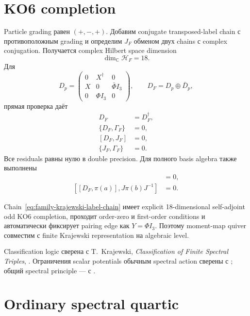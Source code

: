 \section{KO6 completion}

Particle grading равен \((+,-,+)\). Добавим conjugate transposed-label
chain с противоположным grading и определим \(J_F\) обменом двух chains с
complex conjugation. Получается complex Hilbert space dimension
\begin{equation}
 \dim_{\mathbb C}\mathcal H_F=18.
\end{equation}
Для
\begin{equation}
 D_p=
 \begin{pmatrix}
 0&X^\dagger&0\\
 X&0&\bar\Phi I_3\\
 0&\Phi I_3&0
 \end{pmatrix},
 \qquad
 D_F=D_p\oplus\bar D_p,
 \label{eq:family-quiver-ko6-dirac}
\end{equation}
прямая проверка даёт
\begin{align}
 D_F&=D_F^\dagger,\\
 \{D_F,\Gamma_F\}&=0,\\
 [D_F,J_F]&=0,\\
 \{J_F,\Gamma_F\}&=0.
\end{align}
Все residuals равны нулю в double precision. Для полного basis algebra
также выполнены
\begin{align}
 [\pi(a),J\pi(b)J^{-1}]&=0,\\
 [[D_F,\pi(a)],J\pi(b)J^{-1}]&=0.
\end{align}

\begin{theorem}
Chain~\eqref{eq:family-krajewski-label-chain} имеет explicit
18-dimensional self-adjoint odd KO6 completion, проходит order-zero и
first-order conditions и автоматически фиксирует pairing edge как
\(Y=\Phi I_3\). Поэтому moment-map quiver совместим с finite Krajewski
representation на algebraic level.
\end{theorem}

Classification logic сверена с T.~Krajewski,
\emph{Classification of Finite Spectral Triples},
. Ограничения scalar potentials обычным spectral
action сверены с ; общий spectral principle ---
с .

\section{Ordinary spectral quartic}

